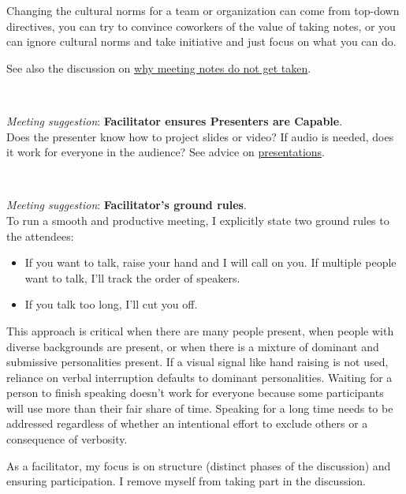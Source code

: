 Changing the cultural norms for a team or organization can come from top-down directives, you can try to convince coworkers of the value of taking notes, or you can ignore cultural norms and take initiative and just focus on what you can do.


See also the discussion on \hyperref[sec:written-comm-does-not-happen]{why meeting notes do not get taken}.

\ \\
\begin{samepage}
\textit{Meeting suggestion}: \textbf{Facilitator ensures Presenters are Capable}.\\
Does the presenter know how to project slides or video? If audio is needed, does it work for everyone in the audience?
See advice on \hyperref[sec:bad-presentations]{presentations}.
\end{samepage}

\ \\
\begin{samepage}
\textit{Meeting suggestion}: \textbf{Facilitator's ground rules}.\\
To run a smooth and productive meeting, I explicitly state two ground rules to the attendees:
\end{samepage}
\begin{itemize}
    \item If you want to talk, raise your hand and I will call on you. If multiple people want to talk, I'll track the order of speakers.
    \item If you talk too long, I'll cut you off. 
\end{itemize}
This approach is critical when there are many people present, when people with diverse backgrounds are present, or when there is a mixture of dominant and submissive personalities present. 
If a visual signal like hand raising is not used, reliance on verbal interruption defaults to dominant personalities. Waiting for a person to finish speaking doesn't work for everyone because some participants will use more than their fair share of time. Speaking for a long time needs to be addressed regardless of whether an intentional effort to exclude others or a consequence of verbosity.

As a facilitator, my focus is on structure (distinct phases of the discussion) and ensuring participation. I remove myself from taking part in the discussion.

